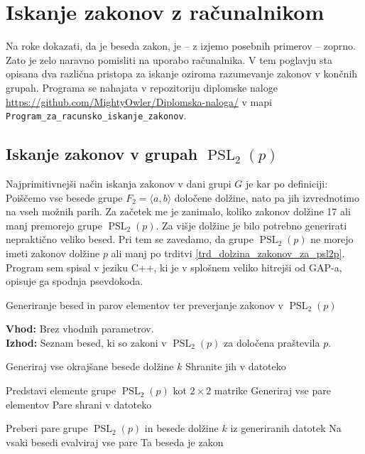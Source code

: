 \section{Iskanje zakonov z računalnikom}
\label{sec_racunalnisko_iskanje}

Na roke dokazati, da je beseda zakon, je -- z izjemo posebnih primerov -- zoprno. 
Zato je zelo naravno pomisliti na uporabo računalnika. 
V tem poglavju sta opisana dva različna pristopa za iskanje  oziroma razumevanje zakonov v končnih grupah. 
Programa se nahajata v repozitoriju diplomske naloge \url{https://github.com/MightyOwler/Diplomska-naloga/} v mapi \texttt{Program\_za\_racunsko\_iskanje\_zakonov}.

\subsection{Iskanje zakonov v grupah $\operatorname{PSL}_2(p)$}\label{sec_iskanje_psl2p}

Najprimitivnejši način iskanja zakonov v dani grupi $G$ je kar po definiciji: Poiščemo vse besede grupe $F_2 = \langle a,b \rangle$ določene dolžine, nato pa jih izvrednotimo na vseh možnih parih.
Za začetek me je zanimalo, koliko zakonov dolžine 17 ali manj premorejo grupe $\operatorname{PSL}_2(p)$. Za višje dolžine je bilo potrebno generirati nepraktično veliko besed. Pri tem se zavedamo, da grupe $\operatorname{PSL}_2(p)$ ne morejo imeti zakonov dolžine $p$ ali manj po trditvi \ref{trd_dolzina_zakonov_za_psl2p}.
Program sem spisal v jeziku C++, ki je v splošnem veliko hitrejši od GAP-a, opisuje ga spodnja psevdokoda.

\begin{algorithm}[ht]
    \caption{Generiranje besed in parov elementov ter preverjanje zakonov v \( \operatorname{PSL}_2(p) \)}
    \label{alg_preverjanje_zakonov}
    \raggedright
    \textbf{Vhod:} Brez vhodnih parametrov. \\
    \textbf{Izhod:} Seznam besed, ki so zakoni v \( \operatorname{PSL}_2(p) \) za določena praštevila \( p \).
  
    \begin{algorithmic}[1]
        \State Generiraj vse okrajšane besede dolžine $k$
        \State Shranite jih v datoteko
      \EndFor
      
        \State Predstavi elemente grupe \( \operatorname{PSL}_2(p) \) kot $2 \times 2$ matrike
        \State Generiraj vse pare elementov
        \State Pare shrani v datoteko
      \EndFor
  
          \State Preberi pare grupe \( \operatorname{PSL}_2(p) \) in besede dolžine $k$ iz generiranih datotek
          \State Na vsaki besedi evalviraj vse pare
            \State Ta beseda je zakon
          \EndIf
        \EndFor
      \EndFor
  
    \end{algorithmic}
  \end{algorithm}


